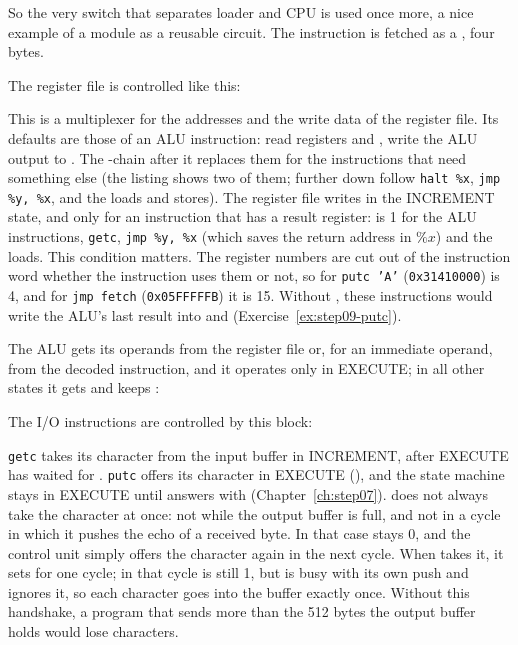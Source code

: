 
So the very switch that separates loader and CPU is used once more, a nice
example of a module as a reusable circuit. The instruction is fetched as a
, four bytes.

The register file is controlled like this:


This is a multiplexer for the addresses and the write data of the register
file. Its defaults are those of an ALU instruction: read registers 
and , write the ALU output  to . The
-chain after it replaces them for the instructions that need something
else (the listing shows two of them; further down follow \texttt{halt \%x},
\texttt{jmp \%y, \%x}, and the loads and stores). The register file writes in
the INCREMENT state, and only for an instruction that has a result register:
 is 1 for the ALU instructions, \texttt{getc}, \texttt{jmp \%y,
\%x} (which saves the return address in $\%x$) and the loads. This condition
matters. The register numbers are cut out of the instruction word whether the
instruction uses them or not, so for \texttt{putc 'A'} (\texttt{0x31410000})
 is 4, and for \texttt{jmp fetch} (\texttt{0x05FFFFFB}) it is 15.
Without , these instructions would write the ALU's last result
into  and  (Exercise~\ref{ex:step09-putc}).

The ALU gets its operands from the register file or, for an immediate
operand, from the decoded instruction, and it operates only in EXECUTE; in
all other states it gets  and keeps :


The I/O instructions are controlled by this block:


\texttt{getc} takes its character from the input buffer in INCREMENT, after
EXECUTE has waited for . \texttt{putc} offers its character
in EXECUTE (), and the state machine stays in EXECUTE until
 answers with  (Chapter~\ref{ch:step07}).
 does not always take the character at once: not while the output
buffer is full, and not in a cycle in which it pushes the echo of a received
byte. In that case  stays 0, and the control unit simply
offers the character again in the next cycle. When  takes it, it
sets  for one cycle; in that cycle  is still
1, but  is busy with its own push and ignores it, so each character
goes into the buffer exactly once. Without this handshake, a program that
sends more than the 512 bytes the output buffer holds would lose characters.

